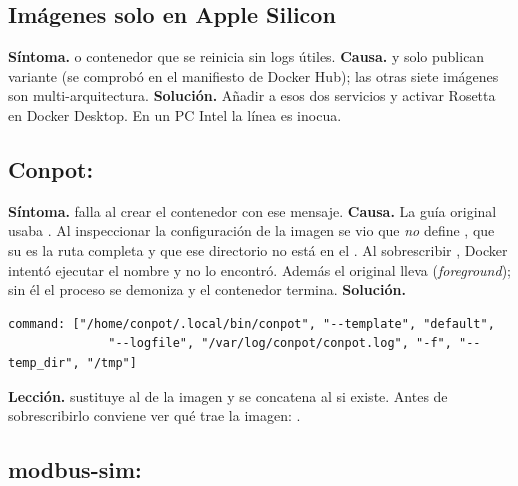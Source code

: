 \subsection{Imágenes solo  en Apple Silicon}

\textbf{Síntoma.}  o contenedor que se reinicia sin logs útiles. \textbf{Causa.}  y  solo publican variante  (se comprobó en el manifiesto de Docker Hub); las otras siete imágenes son multi-arquitectura. \textbf{Solución.} Añadir  a esos dos servicios y activar Rosetta en Docker Desktop. En un PC Intel la línea es inocua.

\subsection{Conpot: }

\textbf{Síntoma.}  falla al crear el contenedor con ese mensaje. \textbf{Causa.} La guía original usaba . Al inspeccionar la configuración de la imagen  se vio que \emph{no} define , que su  es la ruta completa  y que ese directorio no está en el . Al sobrescribir , Docker intentó ejecutar el nombre  y no lo encontró. Además el  original lleva  (\emph{foreground}); sin él el proceso se demoniza y el contenedor termina. \textbf{Solución.}

\begin{lstlisting}[style=yaml]
    command: ["/home/conpot/.local/bin/conpot", "--template", "default",
              "--logfile", "/var/log/conpot/conpot.log", "-f", "--temp_dir", "/tmp"]
\end{lstlisting}

\textbf{Lección.}  sustituye al  de la imagen y se concatena al  si existe. Antes de sobrescribirlo conviene ver qué trae la imagen: .

\subsection{modbus-sim: }

